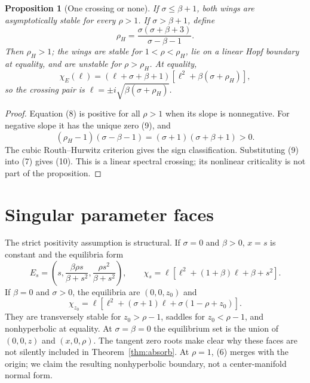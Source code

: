 \documentclass[11pt]{article}
\newtheorem{proposition}{Proposition}
\begin{document}
\begin{proposition}[One crossing or none]\label{prop:hopf}
If $\sigma\le\beta+1$, both wings are asymptotically stable for every
$\rho>1$.  If $\sigma>\beta+1$, define
\begin{equation}
 \rho_H=\frac{\sigma(\sigma+\beta+3)}
                 {\sigma-\beta-1}.                     \tag{9}
\end{equation}
Then $\rho_H>1$; the wings are stable for $1<\rho<\rho_H$, lie on a linear
Hopf boundary at equality, and are unstable for $\rho>\rho_H$.  At equality,
\begin{equation}
 \chi_E(\ell)=(\ell+\sigma+\beta+1)
 [\ell^2+\beta(\sigma+\rho_H)],                         \tag{10}
\end{equation}
so the crossing pair is
$\ell=\pm i\sqrt{\beta(\sigma+\rho_H)}$.
\end{proposition}

\begin{proof}
Equation (8) is positive for all $\rho>1$ when its slope is nonnegative.  For
negative slope it has the unique zero (9), and
\[
 (\rho_H-1)(\sigma-\beta-1)
   =(\sigma+1)(\sigma+\beta+1)>0.
\]
The cubic Routh--Hurwitz criterion gives the sign classification.  Substituting
(9) into (7) gives (10).  This is a linear spectral crossing; its nonlinear
criticality is not part of the proposition.
\end{proof}

\section{Singular parameter faces}
The strict positivity assumption is structural.  If $\sigma=0$ and
$\beta>0$, $x=s$ is constant and the equilibria form
\begin{equation}
 E_s=\left(s,\frac{\beta\rho s}{\beta+s^2},
                 \frac{\rho s^2}{\beta+s^2}\right),
 \qquad
 \chi_s=\ell[\ell^2+(1+\beta)\ell+\beta+s^2].          \tag{11}
\end{equation}
If $\beta=0$ and $\sigma>0$, the equilibria are $(0,0,z_0)$ and
\begin{equation}
 \chi_{z_0}=\ell[\ell^2+(\sigma+1)\ell
                    +\sigma(1-\rho+z_0)].              \tag{12}
\end{equation}
They are transversely stable for $z_0>\rho-1$, saddles for
$z_0<\rho-1$, and nonhyperbolic at equality.  At $\sigma=\beta=0$ the
equilibrium set is the union of $(0,0,z)$ and $(x,0,\rho)$.  The tangent zero
roots make clear why these faces are not silently included in
Theorem~\ref{thm:absorb}.  At $\rho=1$, (6) merges with the origin; we claim
the resulting nonhyperbolic boundary, not a center-manifold normal form.
\end{document}
